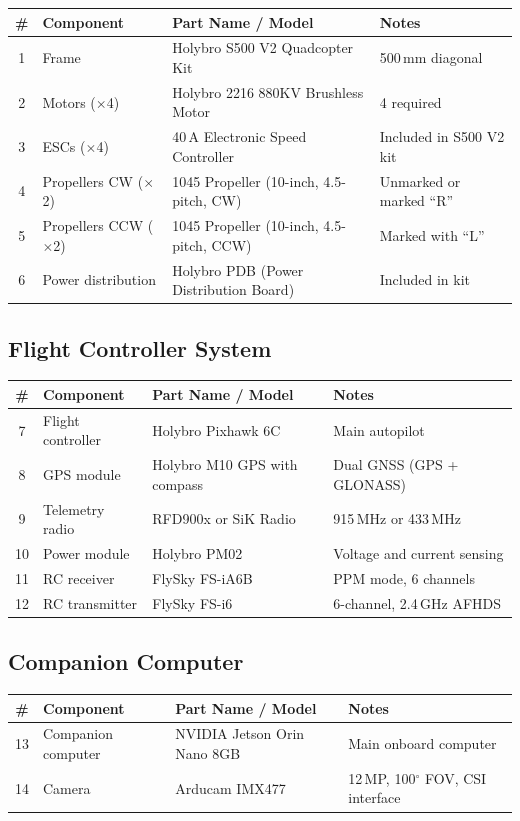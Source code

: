 \documentclass{article}
\begin{document}
\begin{tabular}{clll}
\toprule
\textbf{\#} & \textbf{Component} & \textbf{Part Name / Model} & \textbf{Notes} \\
\midrule
1 & Frame & Holybro S500 V2 Quadcopter Kit~\cite{holybro_s500} & 500\,mm diagonal \\
2 & Motors ($\times$4) & Holybro 2216 880KV Brushless Motor & 4 required \\
3 & ESCs ($\times$4) & 40\,A Electronic Speed Controller & Included in S500 V2 kit \\
4 & Propellers CW ($\times$2) & 1045 Propeller (10-inch, 4.5-pitch, CW) & Unmarked or marked ``R'' \\
5 & Propellers CCW ($\times$2) & 1045 Propeller (10-inch, 4.5-pitch, CCW) & Marked with ``L'' \\
6 & Power distribution & Holybro PDB (Power Distribution Board) & Included in kit \\
\bottomrule
\end{tabular}

\subsection{Flight Controller System}

\begin{tabular}{clll}
\toprule
\textbf{\#} & \textbf{Component} & \textbf{Part Name / Model} & \textbf{Notes} \\
\midrule
7  & Flight controller & Holybro Pixhawk 6C & Main autopilot \\
8  & GPS module & Holybro M10 GPS with compass & Dual GNSS (GPS + GLONASS) \\
9  & Telemetry radio & RFD900x or SiK Radio & 915\,MHz or 433\,MHz \\
10 & Power module & Holybro PM02 & Voltage and current sensing \\
11 & RC receiver & FlySky FS-iA6B & PPM mode, 6 channels \\
12 & RC transmitter & FlySky FS-i6 & 6-channel, 2.4\,GHz AFHDS \\
\bottomrule
\end{tabular}

\subsection{Companion Computer}

\begin{tabular}{clll}
\toprule
\textbf{\#} & \textbf{Component} & \textbf{Part Name / Model} & \textbf{Notes} \\
\midrule
13 & Companion computer & NVIDIA Jetson Orin Nano 8GB & Main onboard computer \\
14 & Camera & Arducam IMX477 & 12\,MP, 100$^\circ$ FOV, CSI interface \\
\bottomrule
\end{tabular}
\end{document}
